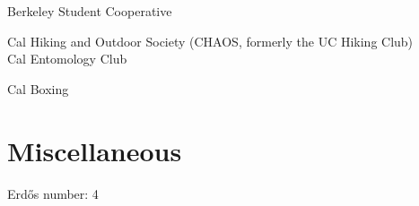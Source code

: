 \documentclass[10pt, letterpaper]{article}
\newcommand{\years}[1]{\marginnote{\scriptsize #1}}
\begin{document}
Berkeley Student Cooperative

Cal Hiking and Outdoor Society (CHAOS, formerly the UC Hiking Club) \\
Cal Entomology Club 

Cal Boxing

\section*{Miscellaneous}
Erdős number: 4





\end{document}
